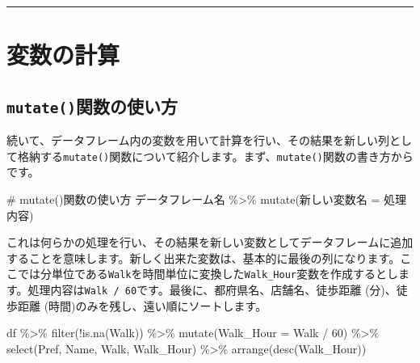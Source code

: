 \documentclass[
  a4paper,
  pandoc,
  ja=standard,
  jafont=haranoaji]{bxjsbook}
\newenvironment{Shaded}{\begin{snugshade}}{\end{snugshade}}
\newcommand{\AttributeTok}[1]{\textcolor[rgb]{0.00,0.48,0.65}{#1}}
\newcommand{\CommentTok}[1]{\textcolor[rgb]{0.37,0.37,0.37}{#1}}
\newcommand{\DecValTok}[1]{\textcolor[rgb]{0.68,0.00,0.00}{#1}}
\newcommand{\FunctionTok}[1]{\textcolor[rgb]{0.28,0.35,0.67}{#1}}
\newcommand{\NormalTok}[1]{\textcolor[rgb]{0.00,0.48,0.65}{#1}}
\newcommand{\OtherTok}[1]{\textcolor[rgb]{0.00,0.48,0.65}{#1}}
\newcommand{\SpecialCharTok}[1]{\textcolor[rgb]{0.37,0.37,0.37}{#1}}
\begin{document}
\begin{center}\rule{0.5\linewidth}{0.5pt}\end{center}

\hypertarget{sec-handling2_mutate}{%
\section{変数の計算}\label{sec-handling2_mutate}}

\hypertarget{mutateux95a2ux6570ux306eux4f7fux3044ux65b9}{%
\subsection{\texorpdfstring{\texttt{mutate()}関数の使い方}{mutate()関数の使い方}}\label{mutateux95a2ux6570ux306eux4f7fux3044ux65b9}}

続いて、データフレーム内の変数を用いて計算を行い、その結果を新しい列として格納する\texttt{mutate()}関数について紹介します。まず、\texttt{mutate()}関数の書き方からです。

\begin{Shaded}
\begin{Highlighting}[numbers=left,,]
\CommentTok{\# mutate()関数の使い方}
\NormalTok{データフレーム名 }\SpecialCharTok{\%\textgreater{}\%}
  \FunctionTok{mutate}\NormalTok{(新しい変数名 }\OtherTok{=}\NormalTok{ 処理内容)}
\end{Highlighting}
\end{Shaded}

これは何らかの処理を行い、その結果を新しい変数としてデータフレームに追加することを意味します。新しく出来た変数は、基本的に最後の列になります。ここでは分単位である\texttt{Walk}を時間単位に変換した\texttt{Walk\_Hour}変数を作成するとします。処理内容は\texttt{Walk\ /\ 60}です。最後に、都府県名、店舗名、徒歩距離
(分)、徒歩距離 (時間)のみを残し、遠い順にソートします。

\begin{Shaded}
\begin{Highlighting}[numbers=left,,]
\NormalTok{df }\SpecialCharTok{\%\textgreater{}\%}
  \FunctionTok{filter}\NormalTok{(}\SpecialCharTok{!}\FunctionTok{is.na}\NormalTok{(Walk)) }\SpecialCharTok{\%\textgreater{}\%}
  \FunctionTok{mutate}\NormalTok{(}\AttributeTok{Walk\_Hour =}\NormalTok{ Walk }\SpecialCharTok{/} \DecValTok{60}\NormalTok{) }\SpecialCharTok{\%\textgreater{}\%}
  \FunctionTok{select}\NormalTok{(Pref, Name, Walk, Walk\_Hour) }\SpecialCharTok{\%\textgreater{}\%}
  \FunctionTok{arrange}\NormalTok{(}\FunctionTok{desc}\NormalTok{(Walk\_Hour))}
\end{Highlighting}
\end{Shaded}
\end{document}
